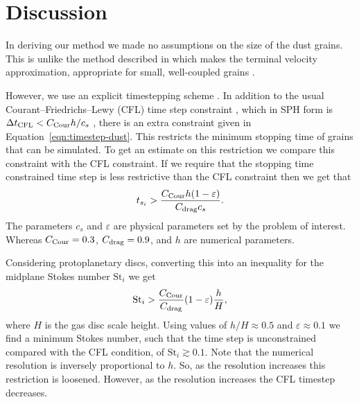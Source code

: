 \documentclass[fleqn,usenatbib]{mnras}
\begin{document}
\section{Discussion}%
\label{sec:discussion}

In deriving our method we made no assumptions on the size of the dust grains.
This is unlike the method described in \citet{Hutchison2018MNRAS.476.2186H}
which makes the terminal velocity approximation, appropriate for small,
well-coupled grains \citep{Youdin2005ApJ...620..459Y}.

However, we use an explicit timestepping scheme
\citep{Price2018PASA...35...31P}. In addition to the usual
Courant–Friedrichs–Lewy (CFL) time step constraint
\citep{Courant1928MatAn.100...32C}, which in SPH form is \(\Delta t_{\rm CFL} <
C_{\rm Cour} h/c_s\) \citep{Price2018PASA...35...31P}, there is an extra
constraint given in Equation~\ref{eqn:timestep-dust}. This restricts the minimum
stopping time of grains that can be simulated. To get an estimate on this
restriction we compare this constraint with the CFL constraint. If we require
that the stopping time constrained time step is less restrictive than the CFL
constraint then we get that
%
\begin{align}
   t_{s_i} > \frac{C_{\rm Cour} h (1 - \varepsilon)}{C_{\rm drag} c_s}.
\end{align}
%
The parameters \(c_s\) and \(\varepsilon\) are physical parameters set by the
problem of interest. Whereas \(C_{\rm Cour} = 0.3\), \(C_{\rm drag} = 0.9\), and
\(h\) are numerical parameters.

Considering protoplanetary discs, converting this into an inequality for the
midplane Stokes number \(\mathrm{St}_i\) we get
%
\begin{align}
   \mathrm{St}_i > \frac{C_{\rm Cour}}{C_{\rm drag}} (1 - \varepsilon) \frac{h}{H},
\end{align}
%
where \(H\) is the gas disc scale height. Using values of \(h/H \approx 0.5\)
and \(\varepsilon \approx 0.1\) we find a minimum Stokes number, such that the
time step is unconstrained compared with the CFL condition, of \(\mathrm{St}_i
\gtrsim 0.1\). Note that the numerical resolution is inversely proportional to
\(h\). So, as the resolution increases this restriction is loosened. However, as
the resolution increases the CFL timestep decreases.
\end{document}
